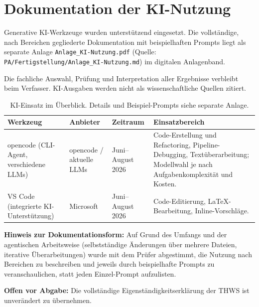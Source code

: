 \section{Dokumentation der KI-Nutzung}

Generative KI-Werkzeuge wurden unterstützend eingesetzt. Die vollständige,
nach Bereichen gegliederte Dokumentation mit beispielhaften Prompts liegt als
separate Anlage \texttt{Anlage\_KI-Nutzung.pdf} (Quelle:
\texttt{PA/Fertigstellung/Anlage\_KI-Nutzung.md}) im digitalen Anlagenband.

Die fachliche Auswahl, Prüfung und Interpretation aller Ergebnisse verbleibt
beim Verfasser. KI-Ausgaben werden nicht als wissenschaftliche Quellen
zitiert.

\begin{table}[H]
\centering
\small
\begin{tabularx}{\textwidth}{p{3.0cm}p{3.2cm}p{2.5cm}X}
\toprule
Werkzeug & Anbieter & Zeitraum & Einsatzbereich\\
\midrule
opencode (CLI-Agent, verschiedene LLMs) & opencode / aktuelle LLMs & Juni--August 2026 &
Code-Erstellung und Refactoring, Pipeline-Debugging, Textüberarbeitung; Modellwahl je nach Aufgabenkomplexität und Kosten.\\
VS Code (integrierte KI-Unterstützung) & Microsoft & Juni--August 2026 &
Code-Editierung, LaTeX-Bearbeitung, Inline-Vorschläge.\\
\bottomrule
\end{tabularx}
\caption{KI-Einsatz im Überblick. Details und Beispiel-Prompts siehe separate Anlage.}
\end{table}

\textbf{Hinweis zur Dokumentationsform:} Auf Grund des Umfangs und der
agentischen Arbeitsweise (selbstständige Änderungen über mehrere Dateien,
iterative Überarbeitungen) wurde mit dem Prüfer abgestimmt, die Nutzung nach
Bereichen zu beschreiben und jeweils durch beispielhafte Prompts zu
veranschaulichen, statt jeden Einzel-Prompt aufzulisten.

\textbf{Offen vor Abgabe:} Die vollständige Eigenständigkeitserklärung der
THWS ist unverändert zu übernehmen.
